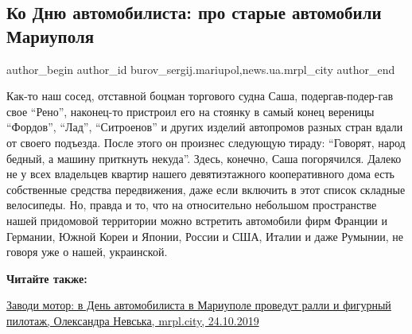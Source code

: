  
 
 
 
 
 
\subsection{Ко Дню автомобилиста: про старые автомобили Мариуполя}
\label{sec:26_10_2019.stz.news.ua.mrpl_city.1.starye_avtomobili_mariupolja}
 
\ifcmt
 author_begin
   author_id burov_sergij.mariupol,news.ua.mrpl_city
 author_end
\fi

Как-то наш сосед, отставной боцман торгового судна Саша, подергав-подер\hyp{}гав свое
\enquote{Рено}, наконец-то пристроил его на стоянку в самый конец вереницы \enquote{Фордов},
\enquote{Лад}, \enquote{Ситроенов} и других изделий автопромов разных стран вдали от своего
подъезда. После этого он произнес следующую тираду: \enquote{Говорят, народ бедный, а
машину приткнуть некуда}. Здесь, конечно, Саша погорячился. Далеко не у всех
владельцев квартир нашего девятиэтажного кооперативного дома есть собственные
средства передвижения, даже если включить в этот список складные велосипеды.
Но, правда и то, что на относительно небольшом пространстве нашей придомовой
территории можно встретить автомобили фирм Франции и Германии, Южной Кореи и
Японии, России и США, Италии и даже Румынии, не говоря уже о нашей, украинской.


\textbf{Читайте также:} 

\href{https://mrpl.city/news/view/zavodi-motor-v-den-avtomobilista-v-mariupole-provedut-ralli-i-figurnyj-pilotazh}{
%
Заводи мотор: в День автомобилиста в Мариуполе проведут ралли и фигурный пилотаж, %
Олександра Невська, mrpl.city, 24.10.2019}

